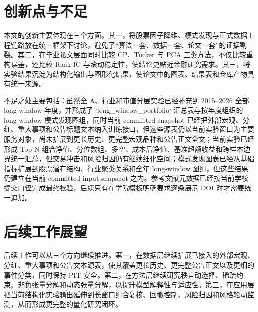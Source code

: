 \section{创新点与不足}

本文的创新主要体现在三个方面。其一，将股票因子降维、模式发现与正式数据工程链路放在统一框架下讨论，避免了“算法一套、数据一套、论文一套”的证据割裂。其二，在毕业论文层面同时比较 CP、Tucker 与 PCA 三类方法，不仅比较重构误差，还比较 Rank IC 与滚动稳定性，使结论更贴近金融研究需求。其三，将实验结果沉淀为结构化输出与图形化结果，使论文中的图表、结果表和仓库产物具有统一来源。

不足之处主要包括：虽然全 A、行业和市值分层实验已经补充到 2015--2026 全部 long-window 年度，并形成了 `long_window_portfolio` 汇总表与按年度组织的 long-window 模式发现图组，同时当前 committed snapshot 已经把外部宏观、分红、重大事项和公告标题文本纳入训练接口，但这些源表仍以当前实验窗口为主要服务对象，尚未扩展到更长历史、更完整宏观品种和公告正文全文；当前实验已经形成 Top-N 组合净值、分位数组、多空、成本后净值、基准超额收益和跨样本边界统一汇总，但交易冲击和风险归因仍有继续细化空间；模式发现图表已经从基础指标扩展到股票潜在结构、行业聚类关系和全年 long-window 图组，但这些结果仍建立在当前 committed input snapshot 之内。参考文献元数据已经按当前学校提交口径完成最终校验，后续只有在学院模板明确要求逐条展示 DOI 时才需要统一追加。

\section{后续工作展望}

后续工作可以从三个方向继续推进。第一，在数据层继续扩展已接入的外部宏观、分红、重大事项和公告文本源表，使其覆盖更长历史、更完整公告正文以及更细的事件分类，同时保持 PIT 安全。第二，在方法层继续研究秩自动选择、稀疏约束、非负张量分解和动态张量分解，以提升模型解释性与适应性。第三，在应用层把当前结构化实验输出延伸到长窗口组合复核、回撤控制、风险归因和风格轮动监测，从而形成更完整的量化研究闭环。

